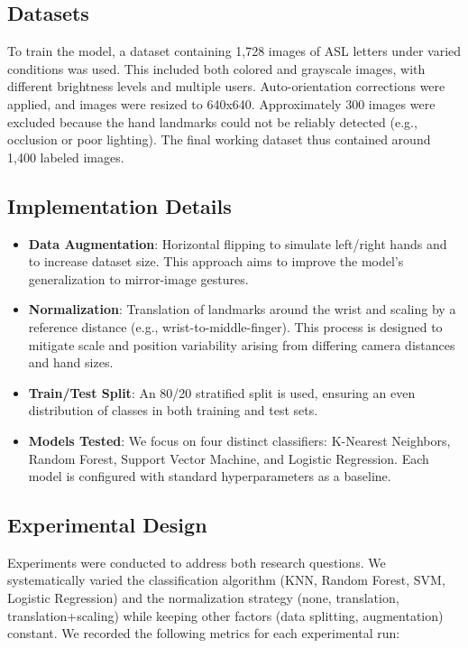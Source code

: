 \documentclass{article}
\begin{document}
\subsection{Datasets}
To train the model, a dataset containing 1,728 images of ASL letters under varied conditions was used. This included both colored and grayscale images, with different brightness levels and multiple users. Auto-orientation corrections were applied, and images were resized to 640x640. Approximately 300 images were excluded because the hand landmarks could not be reliably detected (e.g., occlusion or poor lighting). The final working dataset thus contained around 1,400 labeled images.

\subsection{Implementation Details}
\begin{itemize}
    \item \textbf{Data Augmentation}: Horizontal flipping to simulate left/right hands and to increase dataset size. This approach aims to improve the model's generalization to mirror-image gestures.
    \item \textbf{Normalization}: Translation of landmarks around the wrist and scaling by a reference distance (e.g., wrist-to-middle-finger). This process is designed to mitigate scale and position variability arising from differing camera distances and hand sizes.
    \item \textbf{Train/Test Split}: An 80/20 stratified split is used, ensuring an even distribution of classes in both training and test sets.
    \item \textbf{Models Tested}: We focus on four distinct classifiers: K-Nearest Neighbors, Random Forest, Support Vector Machine, and Logistic Regression. Each model is configured with standard hyperparameters as a baseline.
\end{itemize}

\subsection{Experimental Design}
Experiments were conducted to address both research questions. We systematically varied the classification algorithm (KNN, Random Forest, SVM, Logistic Regression) and the normalization strategy (none, translation, translation+scaling) while keeping other factors (data splitting, augmentation) constant. We recorded the following metrics for each experimental run:
\end{document}
